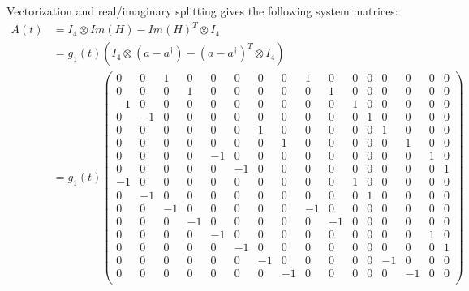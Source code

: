 \documentclass[12pt]{article}
\begin{document}
Vectorization and real/imaginary splitting gives the following system matrices:
\begin{align*}
  A(t) &= I_4 \otimes Im(H) - Im(H)^T \otimes I_4 \\
       &= g_1(t) \left( I_4 \otimes (a-a^{\dagger}) - (a-a^{\dagger})^T \otimes I_4 \right) \\
       &= g_1(t)\left(
          \begin{array}{cccc|cccc|cccc|cccc}
            0 & 0 & 1 & 0  &  0 & 0 & 0 & 0  &    1 & 0 & 0 & 0 &  0 & 0 & 0 & 0\\
            0 & 0 & 0 & 1  &  0 & 0 & 0 & 0  &    0 & 1 & 0 & 0 &  0 & 0 & 0 & 0\\
           -1 & 0 & 0 & 0  &  0 & 0 & 0 & 0  &    0 & 0 & 1 & 0 &  0 & 0 & 0 & 0\\
            0 &-1 & 0 & 0  &  0 & 0 & 0 & 0  &    0 & 0 & 0 & 1 &  0 & 0 & 0 & 0\\
            \hline
            0 & 0 & 0 & 0  &  0 & 0 & 1 & 0  &    0 & 0 & 0 & 0 &  1 & 0 & 0 & 0\\
            0 & 0 & 0 & 0  &  0 & 0 & 0 & 1  &    0 & 0 & 0 & 0 &  0 & 1 & 0 & 0\\
            0 & 0 & 0 & 0  & -1 & 0 & 0 & 0  &    0 & 0 & 0 & 0 &  0 & 0 & 1 & 0\\
            0 & 0 & 0 & 0  &  0 &-1 & 0 & 0  &    0 & 0 & 0 & 0 &  0 & 0 & 0 & 1\\
            \hline
           -1 & 0 & 0 & 0  &  0 & 0 & 0 & 0  &    0 & 0 & 1 & 0 &  0 & 0 & 0 & 0\\
            0 &-1 & 0 & 0  &  0 & 0 & 0 & 0  &    0 & 0 & 0 & 1 &  0 & 0 & 0 & 0\\
            0 & 0 &-1 & 0  &  0 & 0 & 0 & 0  &   -1 & 0 & 0 & 0 &  0 & 0 & 0 & 0\\
            0 & 0 & 0 &-1  &  0 & 0 & 0 & 0  &    0 &-1 & 0 & 0 &  0 & 0 & 0 & 0\\
            \hline
            0 & 0 & 0 & 0  &  -1& 0 & 0 & 0  &    0 & 0 & 0 & 0 &  0 & 0 & 1 & 0\\
            0 & 0 & 0 & 0  &  0 & -1& 0 & 0  &    0 & 0 & 0 & 0 &  0 & 0 & 0 & 1\\
            0 & 0 & 0 & 0  &  0 & 0 & -1& 0  &    0 & 0 & 0 & 0 &  -1& 0 & 0 & 0\\
            0 & 0 & 0 & 0  &  0 & 0 & 0 & -1 &    0 & 0 & 0 & 0 &  0 & -1& 0 & 0\\
       \end{array}
       \right)
\end{align*}
\end{document}
